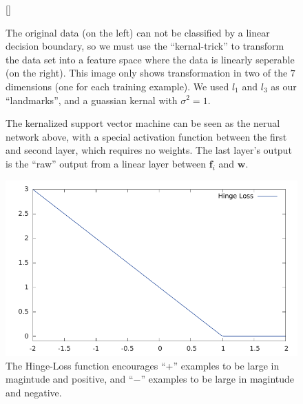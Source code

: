\documentclass[11pt]{article}
\begin{document}
\begin{figure}[H]
  \centering
  [\FBwidth]
  {\caption{The original data (on the left) can not be classified by a linear decision boundary, so we must use the ``kernal-trick'' to transform the data set into a feature space where the data is linearly seperable (on the right). This image only shows transformation in two of the $7$ dimensions (one for each training example). We used $l_{1}$ and $l_{3}$ as our ``landmarks'', and a guassian kernal with $\sigma^{2} = 1$.}\label{fig:svm_nonlinear}}{}
\end{figure}

\begin{minipage}{0.47\linewidth}
  \begin{figure}[H]
    \centering
    
    \caption{The kernalized support vector machine can be seen as the nerual network above, with a special activation function between the first and second layer, which requires no weights. The last layer's output is the ``raw'' output from a linear layer between $\mathbf{f}_{i}$ and $\mathbf{w}$.}
    \label{fig:svm_nn}
  \end{figure}
\end{minipage}\hfill
\begin{minipage}{0.47\linewidth}
  \begin{figure}[H]
    \centering
    \includegraphics[width=0.8\linewidth]{HingeLoss}
    \caption{The Hinge-Loss function encourages ``+'' examples to be large in magintude and positive, and ``$-$'' examples to be large in magintude and negative.}
    \label{fig:hinge_loss}
  \end{figure}
\end{minipage}\vspace{0.5cm}
\end{document}
